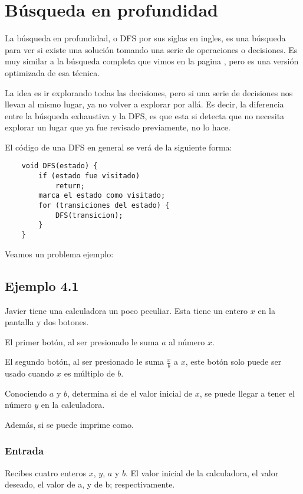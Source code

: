 \chapter*{Búsqueda en profundidad}

La búsqueda en profundidad, o DFS por sus siglas en ingles, es una búsqueda para ver si existe una solución tomando una serie de operaciones o decisiones. Es muy similar a la búsqueda completa que vimos en la pagina \pageref{decision}, pero es una versión optimizada de esa técnica.

La idea es ir explorando todas las decisiones, pero si una serie de decisiones nos llevan al mismo lugar, ya no volver a explorar por allá. Es decir, la diferencia entre la búsqueda exhaustiva y la DFS, es que esta si detecta que no necesita explorar un lugar que ya fue revisado previamente, no lo hace.

El código de una DFS en general se verá de la siguiente forma:

\begin{lstlisting}
	void DFS(estado) {		
		if (estado fue visitado)
			return;
		marca el estado como visitado;
		for (transiciones del estado) {
			DFS(transicion);
		}
	}
\end{lstlisting}

Veamos un problema ejemplo:

\section*{Ejemplo 4.1}
Javier tiene una calculadora un poco peculiar. Esta tiene un entero \(x\) en la pantalla y dos botones.
\begin{plimits}
	\item El primer botón, al ser presionado le suma \(a\) al número \(x\).
	\item El segundo botón, al ser presionado le suma \(\frac{x}{b}\) a \(x\),  este botón solo puede ser usado cuando \(x\) es múltiplo de \(b\).		
\end{plimits}

Conociendo \(a\) y \(b\), determina si de el valor inicial de \(x\), se puede llegar a tener el número \(y\) en la calculadora.

Además, si se puede imprime como.

\subsection*{Entrada}
Recibes cuatro enteros \(x\), \(y\), \(a\) y \(b\). El valor inicial de la calculadora, el valor deseado, el valor de a, y de b; respectivamente.

